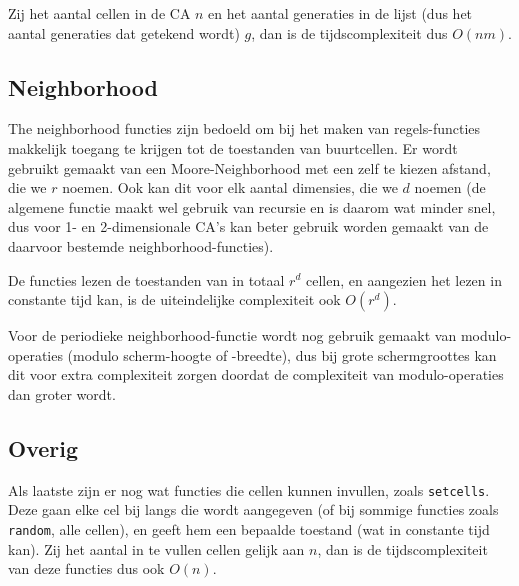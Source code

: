 \documentclass{article}
\begin{document}
Zij het aantal cellen in de CA $n$ en het aantal generaties in de lijst (dus het aantal generaties dat getekend wordt) $g$, dan is de tijdscomplexiteit dus $O(nm)$.

\subsection{Neighborhood}
The neighborhood functies zijn bedoeld om bij het maken van regels-functies makkelijk toegang te krijgen tot de toestanden van buurtcellen. Er wordt gebruikt gemaakt van een Moore-Neighborhood met een zelf te kiezen afstand, die we $r$ noemen. Ook kan dit voor elk aantal dimensies, die we $d$ noemen (de algemene functie maakt wel gebruik van recursie en is daarom wat minder snel, dus voor 1- en 2-dimensionale CA's kan beter gebruik worden gemaakt van de daarvoor bestemde neighborhood-functies). 

De functies lezen de toestanden van in totaal $r^d$ cellen, en aangezien het lezen in constante tijd kan, is de uiteindelijke complexiteit ook $O(r^d)$.

Voor de periodieke neighborhood-functie wordt nog gebruik gemaakt van modulo-operaties (modulo scherm-hoogte of -breedte), dus bij grote schermgroottes kan dit voor extra complexiteit zorgen doordat de complexiteit van modulo-operaties dan groter wordt. 

\subsection{Overig}
Als laatste zijn er nog wat functies die cellen kunnen invullen, zoals \verb|setcells|. Deze gaan elke cel bij langs die wordt aangegeven (of bij sommige functies zoals \verb|random|, alle cellen), en geeft hem een bepaalde toestand (wat in constante tijd kan). Zij het aantal in te vullen cellen gelijk aan $n$, dan is de tijdscomplexiteit van deze functies dus ook $O(n)$.
\end{document}
